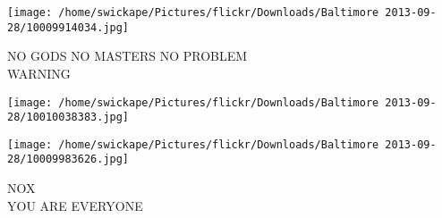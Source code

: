 \documentclass[10pt,letterpaper]{article}
\begin{document}
\vspace{0.25in}
\texttt{[image: /home/swickape/Pictures/flickr/Downloads/Baltimore 2013-09-28/10009914034.jpg]}

NO GODS NO MASTERS NO PROBLEM\\
WARNING
\pagebreak

\texttt{[image: /home/swickape/Pictures/flickr/Downloads/Baltimore 2013-09-28/10010038383.jpg]}

\vspace{0.25in}
\texttt{[image: /home/swickape/Pictures/flickr/Downloads/Baltimore 2013-09-28/10009983626.jpg]}

NOX\\
YOU ARE EVERYONE
\pagebreak
\end{document}

